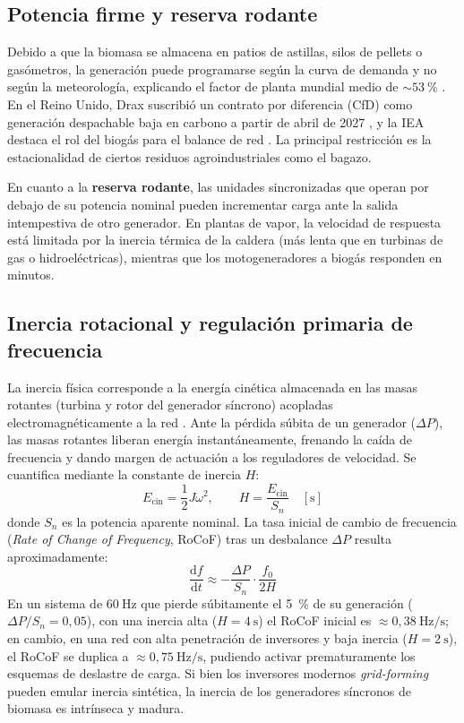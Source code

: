 \subsection{Potencia firme y reserva rodante}
Debido a que la biomasa se almacena en patios de astillas, silos de pellets o gasómetros, la generación puede programarse según la curva de demanda y no según la meteorología, explicando el factor de planta mundial medio de $\sim 53~\%$ \cite{wba2025gbsr}. En el Reino Unido, Drax suscribió un contrato por diferencia (CfD) como generación despachable baja en carbono a partir de abril de 2027 \cite{woodbioenergy2026drax}, y la IEA destaca el rol del biogás para el balance de red \cite{iea2025biogas}. La principal restricción es la estacionalidad de ciertos residuos agroindustriales como el bagazo.

En cuanto a la \textbf{reserva rodante}, las unidades sincronizadas que operan por debajo de su potencia nominal pueden incrementar carga ante la salida intempestiva de otro generador. En plantas de vapor, la velocidad de respuesta está limitada por la inercia térmica de la caldera (más lenta que en turbinas de gas o hidroeléctricas), mientras que los motogeneradores a biogás responden en minutos.

\subsection{Inercia rotacional y regulación primaria de frecuencia}
La inercia física corresponde a la energía cinética almacenada en las masas rotantes (turbina y rotor del generador síncrono) acopladas electromagnéticamente a la red \cite{nrel2014inertia, denholm2020inertia}. Ante la pérdida súbita de un generador ($\Delta P$), las masas rotantes liberan energía instantáneamente, frenando la caída de frecuencia y dando margen de actuación a los reguladores de velocidad. Se cuantifica mediante la constante de inercia $H$:
\begin{equation}
E_{\mathrm{cin}} = \frac{1}{2} J \omega^2, \qquad H = \frac{E_{\mathrm{cin}}}{S_n} \quad [\text{s}]
\end{equation}
donde $S_n$ es la potencia aparente nominal. La tasa inicial de cambio de frecuencia (\textit{Rate of Change of Frequency}, RoCoF) tras un desbalance $\Delta P$ resulta aproximadamente:
\begin{equation}
\frac{\mathrm{d}f}{\mathrm{d}t} \approx -\frac{\Delta P}{S_n} \cdot \frac{f_0}{2H}
\end{equation}
En un sistema de $60~\text{Hz}$ que pierde súbitamente el 5~\% de su generación ($\Delta P / S_n = 0{,}05$), con una inercia alta ($H = 4~\text{s}$) el RoCoF inicial es $\approx 0{,}38~\text{Hz/s}$; en cambio, en una red con alta penetración de inversores y baja inercia ($H = 2~\text{s}$), el RoCoF se duplica a $\approx 0{,}75~\text{Hz/s}$, pudiendo activar prematuramente los esquemas de deslastre de carga. Si bien los inversores modernos \textit{grid-forming} pueden emular inercia sintética, la inercia de los generadores síncronos de biomasa es intrínseca y madura.

